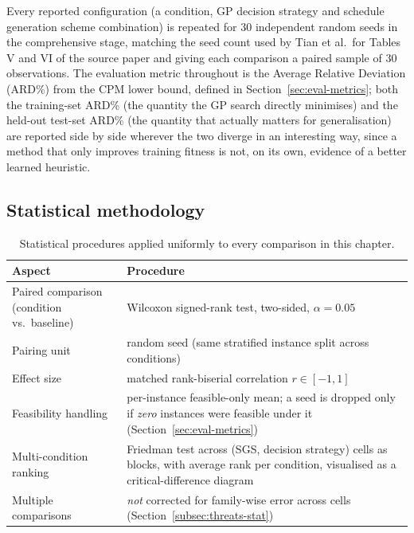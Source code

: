 Every reported configuration (a condition, GP decision strategy and
schedule generation scheme combination) is repeated for 30 independent
random seeds in the comprehensive stage, matching the seed count used by
Tian et al.\ for Tables V and VI of the source paper and giving each
comparison a paired sample of 30 observations. The evaluation metric
throughout is the Average Relative Deviation (ARD\%) from the CPM lower
bound, defined in Section~\ref{sec:eval-metrics}; both the training-set ARD\%
(the quantity the GP search directly minimises) and the held-out test-set
ARD\% (the quantity that actually matters for generalisation) are reported
side by side wherever the two diverge in an interesting way, since a method
that only improves training fitness is not, on its own, evidence of a
better learned heuristic.

\subsection{Statistical methodology}
\label{subsec:statistical-methodology}


\begin{table}[htbp]
  \centering
  \small
  \caption[Statistical methodology]{Statistical procedures applied uniformly
  to every comparison in this chapter.}
  \label{tab:statistical-methodology}
  \begin{tabular}{@{}p{}p{}@{}}
    \toprule
    \textbf{Aspect} & \textbf{Procedure} \\
    \midrule
    Paired comparison (condition vs.\ baseline) & Wilcoxon signed-rank test, two-sided, $\alpha = 0.05$ \\
    Pairing unit & random seed (same stratified instance split across conditions) \\
    Effect size & matched rank-biserial correlation $r \in [-1, 1]$ \\
    Feasibility handling & per-instance feasible-only mean; a seed is dropped only if \emph{zero} instances were feasible under it (Section~\ref{sec:eval-metrics}) \\
    Multi-condition ranking & Friedman test across (SGS, decision strategy) cells as blocks, with average rank per condition, visualised as a critical-difference diagram \\
    Multiple comparisons & \emph{not} corrected for family-wise error across cells (Section~\ref{subsec:threats-stat}) \\
    \bottomrule
  \end{tabular}
\end{table}

